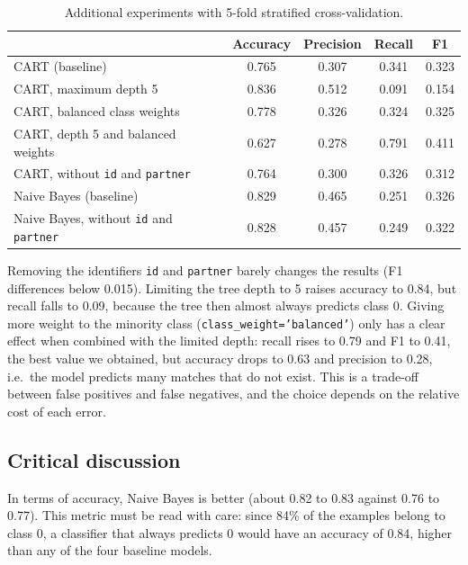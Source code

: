 \documentclass[12pt,a4paper]{article}
\newcommand{\code}[1]{\texttt{#1}}
\begin{document}
\begin{table}[H]
  \centering
  \small
  \begin{tabular}{lcccc}
    \toprule
     & Accuracy & Precision & Recall & F1 \\
    \midrule
    CART (baseline)                          & 0.765 & 0.307 & 0.341 & 0.323 \\
    CART, maximum depth 5                    & 0.836 & 0.512 & 0.091 & 0.154 \\
    CART, balanced class weights             & 0.778 & 0.326 & 0.324 & 0.325 \\
    CART, depth 5 and balanced weights       & 0.627 & 0.278 & 0.791 & 0.411 \\
    CART, without \code{id} and \code{partner} & 0.764 & 0.300 & 0.326 & 0.312 \\
    Naive Bayes (baseline)                   & 0.829 & 0.465 & 0.251 & 0.326 \\
    Naive Bayes, without \code{id} and \code{partner} & 0.828 & 0.457 & 0.249 & 0.322 \\
    \bottomrule
  \end{tabular}
  \caption{Additional experiments with 5-fold stratified cross-validation.}
  \label{tab:extra}
\end{table}

Removing the identifiers \code{id} and \code{partner} barely changes the results (F1 differences below 0.015). Limiting the tree depth to 5 raises accuracy to 0.84, but recall falls to 0.09, because the tree then almost always predicts class 0. Giving more weight to the minority class (\code{class\_weight='balanced'}) only has a clear effect when combined with the limited depth: recall rises to 0.79 and F1 to 0.41, the best value we obtained, but accuracy drops to 0.63 and precision to 0.28, i.e.\ the model predicts many matches that do not exist. This is a trade-off between false positives and false negatives, and the choice depends on the relative cost of each error.

\subsection{Critical discussion}

In terms of accuracy, Naive Bayes is better (about 0.82 to 0.83 against 0.76 to 0.77). This metric must be read with care: since 84\% of the examples belong to class 0, a classifier that always predicts 0 would have an accuracy of 0.84, higher than any of the four baseline models.
\end{document}
